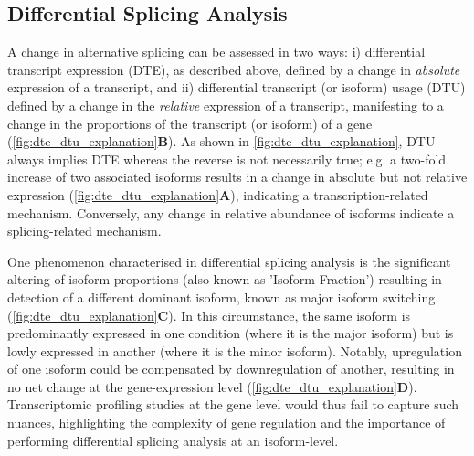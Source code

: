 \subsection{Differential Splicing Analysis}\label{intro:dtu}
A change in alternative splicing can be assessed in two ways: i) differential transcript expression (DTE), as described above, defined by a change in \textit{absolute} expression of a transcript, and ii) differential transcript (or isoform) usage (DTU) defined by a change in the \textit{relative} expression of a transcript, manifesting to a change in the proportions of the transcript (or isoform) of a gene (\cref{fig:dte_dtu_explanation}\textbf{B}). As shown in \cref{fig:dte_dtu_explanation}, DTU always implies DTE whereas the reverse is not necessarily true; e.g. a two-fold increase of two associated isoforms results in a change in absolute but not relative expression (\cref{fig:dte_dtu_explanation}\textbf{A}), indicating a transcription-related mechanism. Conversely, any change in relative abundance of isoforms indicate a splicing-related mechanism. 

One phenomenon characterised in differential splicing analysis is the significant altering of isoform proportions (also known as 'Isoform Fraction') resulting in detection of a different dominant isoform, known as major isoform switching (\cref{fig:dte_dtu_explanation}\textbf{C}). In this circumstance, the same isoform is predominantly expressed in one condition (where it is the major isoform) but is lowly expressed in another (where it is the minor isoform). Notably, upregulation of one isoform could be compensated by downregulation of another, resulting in no net change at the gene-expression level (\cref{fig:dte_dtu_explanation}\textbf{D}). Transcriptomic profiling studies at the gene level would thus fail to capture such nuances, highlighting the complexity of gene regulation and the importance of performing differential splicing analysis at an isoform-level. 


